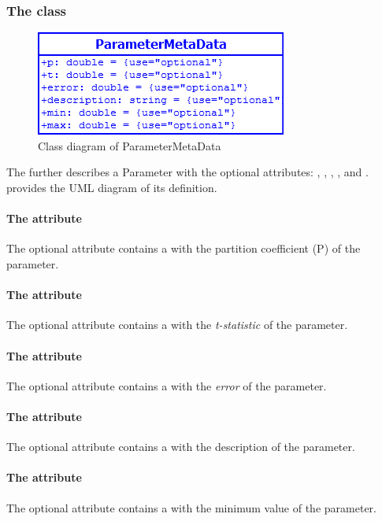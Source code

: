 \subsubsection{The  class}
\begin{figure}
	\includegraphics[scale=0.8]{img/ParameterMetaData}
	\caption{Class diagram of ParameterMetaData}
	\label{ParameterMetaData}
\end{figure}

\label{parametermetadata-class}
The \ParameterMetaData further describes a Parameter with the optional
attributes: , , , ,
 and .  provides the UML diagram of
its definition.

\paragraph{The  attribute}
The optional attribute  contains a  with the partition
coefficient (P) of the parameter.

\paragraph{The  attribute}
The optional attribute  contains a  with the
\emph{t-statistic} of the parameter.

\paragraph{The  attribute}
The optional attribute  contains a  with the
\emph{error} of the parameter.

\paragraph{The  attribute}
The optional attribute  contains a  with the
description of the parameter.

\paragraph{The  attribute}
The optional attribute  contains a  with the
minimum value of the parameter.

